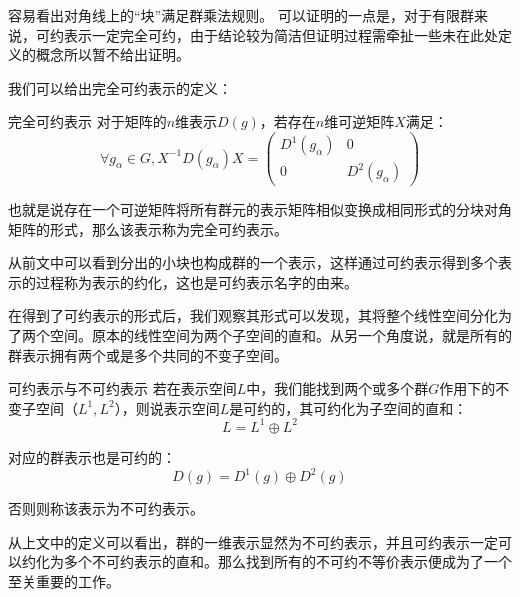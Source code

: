 容易看出对角线上的“块”满足群乘法规则。
可以证明的一点是，对于有限群来说，可约表示一定完全可约，由于结论较为简洁但证明过程需牵扯一些未在此处定义的概念所以暂不给出证明。

我们可以给出完全可约表示的定义：
\begin{definition}{完全可约表示}
对于矩阵的$n$维表示$D(g)$，若存在$n$维可逆矩阵$X$满足：
\begin{equation}
\forall g_\alpha\in G ,X^{-1}D(g_\alpha)X=
\begin{pmatrix}
 D^1(g_\alpha) & 0\\
 0 & D^2(g_\alpha)
\end{pmatrix}
\end{equation}

也就是说存在一个可逆矩阵将所有群元的表示矩阵相似变换成相同形式的分块对角矩阵的形式，那么该表示称为完全可约表示。
\end{definition}

从前文中可以看到分出的小块也构成群的一个表示，这样通过可约表示得到多个表示的过程称为表示的约化，这也是可约表示名字的由来。

在得到了可约表示的形式后，我们观察其形式可以发现，其将整个线性空间分化为了两个空间。原本的线性空间为两个子空间的直和。从另一个角度说，就是所有的群表示拥有两个或是多个共同的不变子空间。

\begin{definition}{可约表示与不可约表示}
若在表示空间$L$中，我们能找到两个或多个群$G$作用下的不变子空间（$L^1,L^2$），则说表示空间$L$是可约的，其可约化为子空间的直和：
$$L=L^1\oplus L^2$$

对应的群表示也是可约的：
$$D(g)=D^1(g)\oplus D^2(g)$$

否则则称该表示为不可约表示。
\end{definition}

从上文中的定义可以看出，群的一维表示显然为不可约表示，并且可约表示一定可以约化为多个不可约表示的直和。那么找到所有的不可约不等价表示便成为了一个至关重要的工作。
